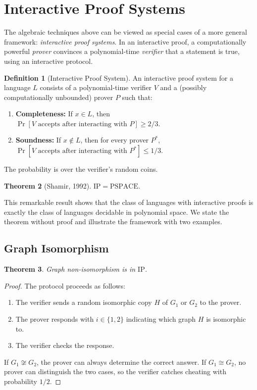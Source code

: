 \documentclass[twoside,12pt]{book}
\theoremstyle{plain}
\newtheorem{theorem}{Theorem}[chapter]
\theoremstyle{definition}
\newtheorem{definition}[theorem]{Definition}
\theoremstyle{remark}
\begin{document}
\section{Interactive Proof Systems}
\label{sec:interactive-proofs}

The algebraic techniques above can be viewed as special cases of a more general framework: \emph{interactive proof systems}. In an interactive proof, a computationally powerful \emph{prover} convinces a polynomial-time \emph{verifier} that a statement is true, using an interactive protocol.

\begin{definition}[Interactive Proof System]
An interactive proof system for a language $L$ consists of a polynomial-time verifier $V$ and a (possibly computationally unbounded) prover $P$ such that:
\begin{enumerate}[label=(\roman*)]
\item \textbf{Completeness:} If $x \in L$, then $\Pr[V \text{ accepts after interacting with } P] \geq 2/3$.
\item \textbf{Soundness:} If $x \notin L$, then for every prover $P^*$, $\Pr[V \text{ accepts after interacting with } P^*] \leq 1/3$.
\end{enumerate}
The probability is over the verifier's random coins.
\end{definition}

\begin{theorem}[Shamir, 1992]
$\mathrm{IP} = \mathrm{PSPACE}$.
\end{theorem}

This remarkable result shows that the class of languages with interactive proofs is exactly the class of languages decidable in polynomial space. We state the theorem without proof and illustrate the framework with two examples.

\subsection*{Graph Isomorphism}

\begin{theorem}
Graph non-isomorphism is in $\mathrm{IP}$.
\end{theorem}

\begin{proof}
The protocol proceeds as follows:
\begin{enumerate}
\item The verifier sends a random isomorphic copy $H$ of $G_1$ or $G_2$ to the prover.
\item The prover responds with $i \in \{1, 2\}$ indicating which graph $H$ is isomorphic to.
\item The verifier checks the response.
\end{enumerate}
If $G_1 \not\cong G_2$, the prover can always determine the correct answer. If $G_1 \cong G_2$, no prover can distinguish the two cases, so the verifier catches cheating with probability $1/2$.
\end{proof}
\end{document}
